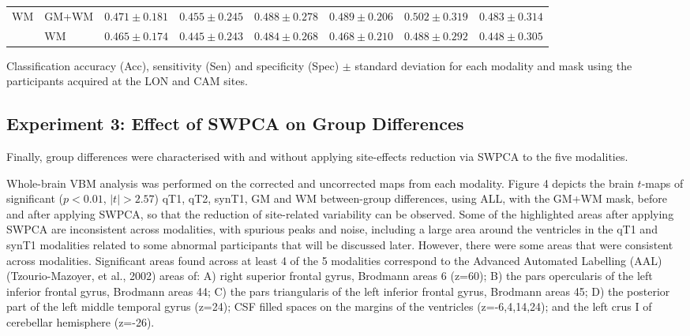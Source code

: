 \begin{bigtable}
\begin{tabularx}{\linewidth}{ll|XXX|XXX}
		\midrule
		\multirow{2}{*}{\ac{WM}} &GM+WM &		$ 0.471 \pm 0.181 $ & $ 0.455 \pm 0.245 $ & $ 0.488 \pm 0.278 $ & $ 0.489 \pm 0.206 $ & $ 0.502 \pm 0.319 $ &  $ 0.483 \pm 0.314 $ \\
		&		WM &		$ 0.465 \pm 0.174 $ & $ 0.445 \pm 0.243 $ & $ 0.484 \pm 0.268 $ & $ 0.468 \pm 0.210 $ & $ 0.488 \pm 0.292 $ &  $ 0.448 \pm 0.305 $ \\
		\bottomrule
	\end{tabularx}
	\caption[Classification accuracy (Acc), sensitivity (Sen) and specificity (Spec) $\pm$ standard deviation for each modality and mask using the participants acquired at the LON and CAM sites.]{Classification accuracy (Acc), sensitivity (Sen) and specificity (Spec) $\pm$ standard deviation for each modality and mask using the participants acquired at the LON and CAM sites.}
	\label{tab:swpcaLONCAM}
\end{bigtable}



\subsection{Experiment 3: Effect of \acs{SWPCA} on Group Differences}\label{sec:swpcaE3}
Finally, group differences were characterised with and without applying
site-effects reduction via \ac{SWPCA} to the five modalities. 

Whole-brain \ac{VBM} analysis was performed on the corrected and uncorrected
maps from each modality. Figure 4 depicts the brain $t$-maps
of significant ($p<0.01$, $|t|>2.57$) \ac{qT1}, \ac{qT2}, \ac{synT1}, \ac{GM} and \ac{WM} between-group differences, using ALL, with the GM+WM mask,
before and after applying \ac{SWPCA}, so that the reduction of site-related
variability can be observed. Some of the highlighted areas after
applying \ac{SWPCA} are inconsistent across modalities, with spurious peaks
and noise, including a large area around the ventricles in the \ac{qT1} and
\ac{synT1} modalities related to some abnormal participants that will be
discussed later. However, there were some areas that were consistent
across modalities. Significant areas found across at least 4 of the 5
modalities correspond to the Advanced Automated Labelling (AAL)
(Tzourio-Mazoyer, et al., 2002) areas of: A) right superior frontal
gyrus, Brodmann areas 6 (z=60); B) the pars opercularis of the left
inferior frontal gyrus, Brodmann areas 44; C) the pars triangularis of
the left inferior frontal gyrus, Brodmann areas 45; D) the posterior
part of the left middle temporal gyrus (z=24); CSF filled spaces on the
margins of the ventricles (z=-6,4,14,24); and the left crus I of
cerebellar hemisphere (z=-26).

